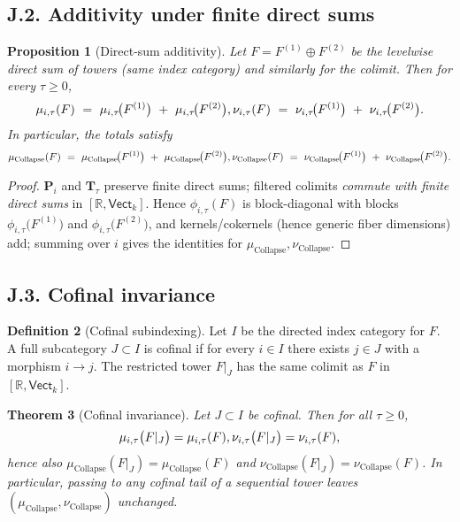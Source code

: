 \documentclass[11pt]{article}
\numberwithin{equation}{section}
\newtheorem{theorem}{Theorem}[section]
\newtheorem{proposition}[theorem]{Proposition}
\theoremstyle{definition}
\newtheorem{definition}[theorem]{Definition}
\DeclareRobustCommand{\muc}{\mu_{\mathrm{Collapse}}}
\DeclareRobustCommand{\nuc}{\nu_{\mathrm{Collapse}}}
\providecommand{\n}{\unskip\space}
\begin{document}
\subsection*{J.2. Additivity under finite direct sums}

\begin{proposition}[Direct-sum additivity]\label{J:prop:sum}
Let \(F=F^{(1)}\oplus F^{(2)}\) be the levelwise direct sum of towers (same index category) and similarly for the colimit.
Then for every \(\tau\ge 0\),
\[
\mu_{i,\tau}(F)\ =\ \mu_{i,\tau}\!\big(F^{(1)}\big)\ +\ \mu_{i,\tau}\!\big(F^{(2)}\big),\qquad\n\nu_{i,\tau}(F)\ =\ \nu_{i,\tau}\!\big(F^{(1)}\big)\ +\ \nu_{i,\tau}\!\big(F^{(2)}\big).
\]
In particular, the totals satisfy
\[
\muc(F)\ =\ \muc\!\big(F^{(1)}\big)\ +\ \muc\!\big(F^{(2)}\big),\qquad\n\nuc(F)\ =\ \nuc\!\big(F^{(1)}\big)\ +\ \nuc\!\big(F^{(2)}\big).
\]
\end{proposition}

\begin{proof}
\(\mathbf{P}_i\) and \(\mathbf{T}_\tau\) preserve finite direct sums; filtered colimits \emph{commute with finite direct sums} in \([\mathbb{R},\mathsf{Vect}_k]\).
Hence \(\phi_{i,\tau}(F)\) is block-diagonal with blocks \(\phi_{i,\tau}\!\big(F^{(1)}\big)\) and \(\phi_{i,\tau}\!\big(F^{(2)}\big)\), and kernels/cokernels (hence generic fiber dimensions) add; summing over \(i\) gives the identities for \(\muc,\nuc\).
\end{proof}

\subsection*{J.3. Cofinal invariance}

\begin{definition}[Cofinal subindexing]
Let \(I\) be the directed index category for \(F\).
A full subcategory \(J\subset I\) is cofinal if for every \(i\in I\) there exists \(j\in J\) with a morphism \(i\to j\).
The restricted tower \(F|_J\) has the same colimit as \(F\) in \([\mathbb{R},\mathsf{Vect}_k]\).
\end{definition}

\begin{theorem}[Cofinal invariance]\label{J:thm:cofinal}
Let \(J\subset I\) be cofinal. Then for all \(\tau\ge 0\),
\[
\mu_{i,\tau}\big(F|_J\big)=\mu_{i,\tau}(F),\qquad\n\nu_{i,\tau}\big(F|_J\big)=\nu_{i,\tau}(F),
\]
hence also \(\muc(F|_J)=\muc(F)\) and \(\nuc(F|_J)=\nuc(F)\).
In particular, passing to any cofinal tail of a sequential tower leaves \((\muc,\nuc)\) unchanged.
\end{theorem}
\end{document}
